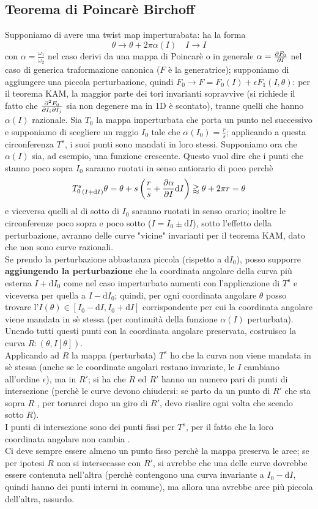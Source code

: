 \documentclass[a4paper,12pt]{article}
\theoremstyle{plain}
\theoremstyle{definition}
\newcommand{\f}[2]{\frac{#1}{#2}}
\renewcommand{\d}{\text{d}}
\theoremstyle{remark}
\begin{document}
\subsection{Teorema di Poincarè Birchoff}
Supponiamo di avere una twist map imperturabata: ha la forma \[\theta\rightarrow\theta+2\pi \alpha(I)\quad I\rightarrow I		\]
con $\alpha=\f{\omega_1}{\omega_2}$ nel caso derivi da una mappa di Poincarè o in generale $\alpha=\pdv{F_0}{I}$ nel caso di generica traformazione canonica ($F$ è la generatrice); supponiamo di aggiungere una piccola perturbazione, quindi $F_0\rightarrow F= F_0(I)+\epsilon F_1(I,\theta)$: per il teorema KAM, la maggior parte dei tori invarianti sopravvive (si richiede il fatto che $\pdv[2]{F_0}{I_i}{I_j}$ sia non degenere ma in 1D è scontato), tranne quelli che hanno $\alpha(I)$ razionale. Sia $T_0$ la mappa imperturbata che porta un punto nel successivo e supponiamo di scegliere un raggio $I_0$ tale che $\alpha(I_0)=\f{r}{s}$; applicando a questa circonferenza $T^s$, i suoi punti sono mandati in loro stessi. Supponiamo ora che $\alpha(I) $ sia, ad esempio, una funzione crescente. Questo vuol dire che i punti che stanno poco sopra $I_0$ saranno ruotati in senso antiorario di poco perchè \[{T_0^s}_{(I+\d I)} \theta=\theta+s\left(\f{r}{s}+\pdv{\alpha}{I}\d I\right) \gtrapprox \theta+2\pi r=\theta
\]
e viceversa quelli al di sotto di $I_0$ saranno ruotati in senso orario; inoltre le  circonferenze poco sopra e poco sotto ($I=I_0\pm\d I$), sotto l'effetto della perturbazione, avranno delle curve "vicine" invarianti per il teorema KAM, dato che non sono curve razionali.
\\Se prendo la perturbazione abbastanza piccola (rispetto a $\d I_0$), posso supporre \textbf{aggiungendo la perturbazione} che la coordinata angolare della curva più esterna $I+\d I_0$ come nel caso imperturbato aumenti  con l'applicazione di $T^s$  e viceversa per quella a $I-\d I_0$; quindi, per ogni coordinata angolare $\theta$ posso trovare l'$I(\theta)\in [I_0-\d I,I_0+\d I]$ corrispondente per cui la coordinata angolare viene mandata in sè stessa (per continuità della funzione $\alpha(I)$ perturbata). Unendo tutti questi punti  con la coordinata angolare preservata, costruisco la curva $R: (\theta,I[\theta])$. \\Applicando ad $R$ la mappa (perturbata) $T^s$ ho che la curva non viene mandata in sè stessa (anche se le coordinate angolari restano invariate, le $I$ cambiano all'ordine $\epsilon$), ma in $R'$; si ha che $R$ ed $R'$ hanno un numero pari di punti di intersezione (perchè le curve devono chiudersi: se parto da un punto di $R'$ che sta sopra $R$ , per tornarci dopo un giro di $R'$, devo risalire ogni volta che scendo sotto $R$). \\ I punti di intersezione sono dei punti fissi per $T^s$, per il fatto che la loro coordinata angolare non cambia .	\\
Ci deve sempre essere almeno un punto fisso perchè la mappa preserva le aree; se per ipotesi $R$ non si intersecasse con $R'$, si avrebbe che una delle curve dovrebbe essere contenuta nell'altra (perchè contengono una curva invariante a $I_0-\d I$, quindi hanno dei punti interni in comune), ma allora una avrebbe aree più piccola dell'altra, assurdo.\\
\end{document}
